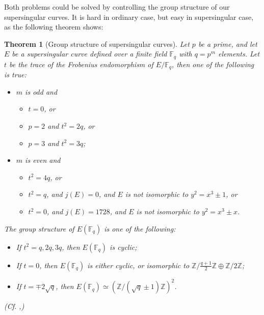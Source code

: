 \documentclass{article}
\theoremstyle{theorem}
\newtheorem{theorem}{Theorem}
\theoremstyle{definition}
\begin{document}
Both problems could be solved by controlling the group structure of our supersingular curves. It is hard in ordinary case, but easy in supersingular case, as the following theorem shows:

\begin{theorem}[Group structure of supersingular curves]
	Let $p$ be a prime, and let $E$ be a supersingular curve defined over a finite field $\mathbb{F}_q$ with $q = p^m$ elements. Let $t$ be the trace of the Frobenius endomorphism of $E/\mathbb{F}_q$, then one of the following is true:
	
		\begin{itemize}
			\item $m$ is odd and
					
					\begin{itemize}
						\item $t = 0$, or
						
						\item $p = 2$ and $t^2 = 2q$, or
						
						\item $p = 3$ and $t^2 = 3q$;
					\end{itemize}
			
			\item $m$ is even and
					
					\begin{itemize}
						\item $t^2 = 4q$, or
						
						\item  $t^2 = q$, and $j(E) = 0$, and $E$ is not isomorphic to $y^2 = x^3 \pm 1$, or
						
						\item $t^2 = 0$, and $j(E) = 1728$, and $E$ is not isomorphic to $y^2 = x^3 \pm x$.
					\end{itemize}
		\end{itemize}
	The group structure of $E(\mathbb{F}_q)$ is one of the following:
	
	\begin{itemize}
		\item If $t^2 = q, 2q, 3q$, then $E(\mathbb{F}_q)$ is cyclic;
		
		\item If $t = 0$, then $E(\mathbb{F}_q)$ is either cyclic, or isomorphic to $\mathbb{Z}/ \frac{q + 1}{2}\mathbb{Z} \oplus \mathbb{Z}/2\mathbb{Z}$;
		
		\item  If $t = \mp 2\sqrt{q}$, then $E(\mathbb{F}_q) \simeq (\mathbb{Z}/(\sqrt{q} \pm 1)\mathbb{Z})^2$.
	\end{itemize}
(Cf. \cite{Waterhouse},\cite{MOV})
\end{theorem}
\end{document}
